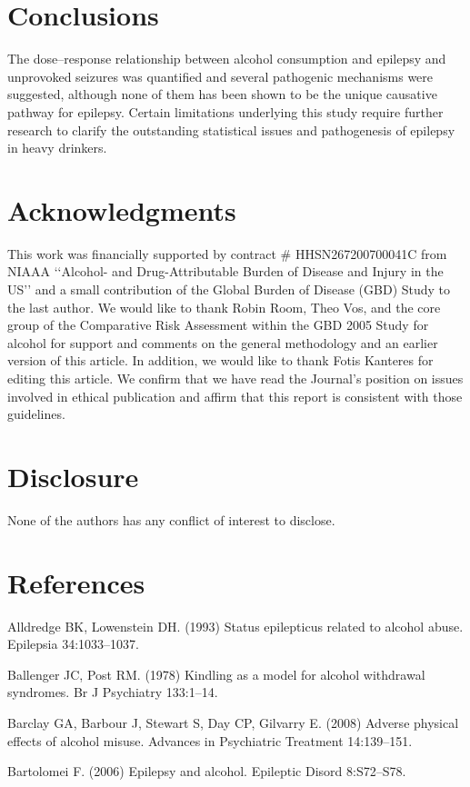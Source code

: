 \documentclass{article}
\begin{document}
\section{Conclusions}
The dose–response relationship between alcohol consumption and epilepsy and unprovoked seizures was quantified and several pathogenic mechanisms were suggested, although none of them has been shown to be the unique causative pathway for epilepsy. Certain limitations underlying this study require further research to clarify the outstanding statistical issues and pathogenesis of epilepsy in heavy drinkers.

\section{Acknowledgments}
This work was financially supported by contract \# HHSN267200700041C from NIAAA ‘‘Alcohol- and Drug-Attributable Burden of Disease and Injury in the US’’ and a small contribution of the Global Burden of Disease (GBD) Study to the last author. We would like to thank Robin Room, Theo Vos, and the core group of the Comparative Risk Assessment within the GBD 2005 Study for alcohol for support and comments on the general methodology and an earlier version of this article. In addition, we would like to thank Fotis Kanteres for editing this article. We confirm that we have read the Journal’s position on issues involved in ethical publication and affirm that this report is consistent with those guidelines.

\section{Disclosure}
None of the authors has any conflict of interest to disclose.


\section{References}
Alldredge BK, Lowenstein DH. (1993) Status epilepticus related to alcohol abuse. Epilepsia 34:1033–1037.

Ballenger JC, Post RM. (1978) Kindling as a model for alcohol withdrawal syndromes. Br J Psychiatry 133:1–14.

Barclay GA, Barbour J, Stewart S, Day CP, Gilvarry E. (2008) Adverse physical effects of alcohol misuse. Advances in Psychiatric Treatment 14:139–151.

Bartolomei F. (2006) Epilepsy and alcohol. Epileptic Disord 8:S72–S78.
\end{document}
